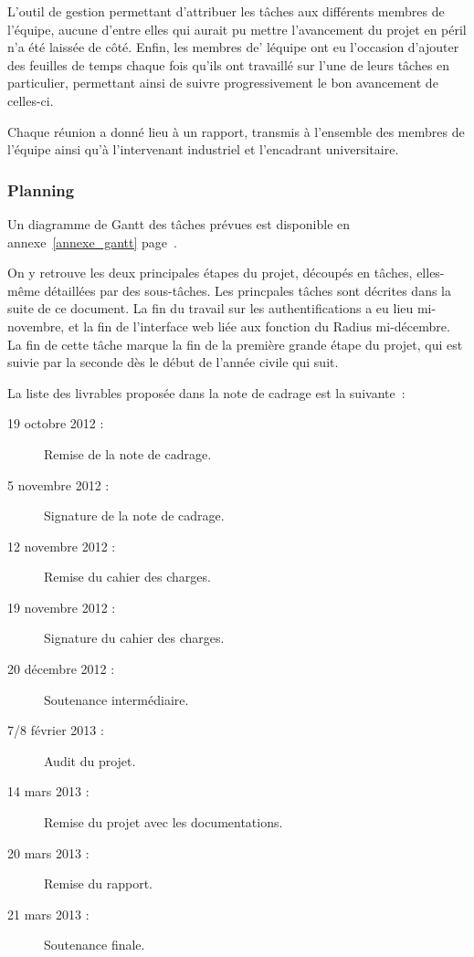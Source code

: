 L'outil de gestion permettant d'attribuer les tâches aux différents membres de l'équipe, aucune d'entre elles qui aurait pu mettre l'avancement du projet en péril n'a été laissée de côté. Enfin, les membres de' léquipe ont eu l'occasion d'ajouter des feuilles de temps chaque fois qu'ils ont travaillé sur l'une de leurs tâches en particulier, permettant ainsi de suivre progressivement le bon avancement de celles-ci.

Chaque réunion a donné lieu à un rapport, transmis à l'ensemble des membres de l'équipe ainsi qu'à l'intervenant industriel et l'encadrant universitaire.

\subsubsection{Planning}

Un diagramme de Gantt des tâches prévues est disponible en annexe~\ref{annexe_gantt} page~\pageref{annexe_gantt}.

On y retrouve les deux principales étapes du projet, découpés en tâches, elles-même détaillées par des sous-tâches. Les princpales tâches sont décrites dans la suite de ce document. La fin du travail sur les authentifications a eu lieu mi-novembre, et la fin de l'interface web liée aux fonction du Radius mi-décembre. La fin de cette tâche marque la fin de la première grande étape du projet, qui est suivie par la seconde dès le début de l'année civile qui suit.

La liste des livrables proposée dans la note de cadrage est la suivante~:

\begin{description}
\item[19 octobre 2012 :] Remise de la note de cadrage.
\item[5 novembre 2012 :] Signature de la note de cadrage.
\item[12 novembre 2012 :] Remise du cahier des charges.
\item[19 novembre 2012 :] Signature du cahier des charges.
\item[20 décembre 2012 :] Soutenance intermédiaire.
\item[7/8 février 2013 :] Audit du projet.
\item[14 mars 2013 :] Remise du projet avec les documentations.
\item[20 mars 2013 :] Remise du rapport.
\item[21 mars 2013 :] Soutenance finale.
\end{description}

